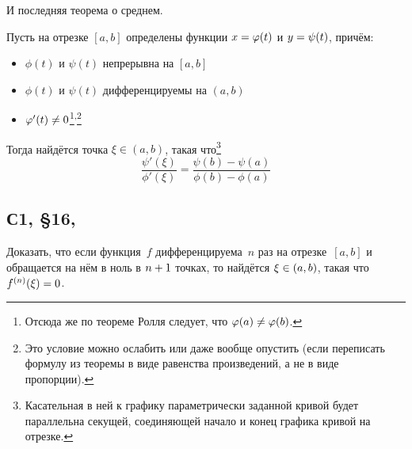 \documentclass[a4paper,12pt]{article}
\begin{document}
  И последняя теорема о среднем.

  \begin{theorem}\label{theo:cochi}
    Пусть на отрезке $[a, b]$ определены функции $x \hm= \phi(t)$ и $y \hm= \psi(t)$, причём:
    \begin{itemize}
      \item $\phi(t)$ и $\psi(t)$ непрерывна на $[a, b]$
      \item $\phi(t)$ и $\psi(t)$ дифференцируемы на $(a, b)$
      \item $\phi'(t) \hm{\not=} 0$\footnote{
        Отсюда же по теореме Ролля следует, что $\phi(a) \hm{\not=} \phi(b)$.
      }\textsuperscript{,}\footnote{
        Это условие можно ослабить или даже вообще опустить (если переписать формулу из теоремы в виде равенства произведений, а не в виде пропорции).
      }
    \end{itemize}

    Тогда найдётся точка $\xi \in (a, b)$, такая что\footnote{
      Касательная в ней к графику параметрически заданной кривой будет параллельна секущей, соединяющей начало и конец графика кривой на отрезке.
    }
    \[
      \frac{\psi'(\xi)}{\phi'(\xi)} = \frac{\psi(b) - \psi(a)}{\phi(b) - \phi(a)}
    \]
  \end{theorem}




  \subsection{С1, \S 16, }

  Доказать, что если функция~$f$ дифференцируема~$n$ раз на отрезке~$[a, b]$ и обращается на нём в ноль в $n \hm+ 1$ точках, то найдётся $\xi \hm\in (a, b)$, такая что $f^{(n)}(\xi) \hm= 0$.
  
\end{document}
